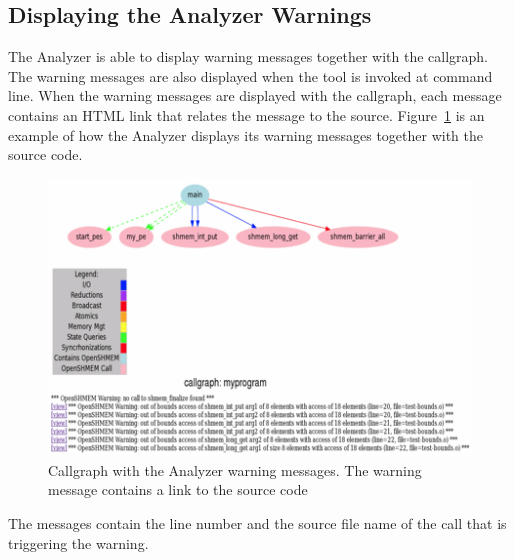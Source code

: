 \subsection{Displaying the \openshmem Analyzer Warnings}

The \openshmem Analyzer is able to display \openshmem warning messages
together with the callgraph. The warning messages are also displayed
when the tool is invoked at command line. When the warning messages
are displayed with the callgraph, each message contains an HTML link
that relates the message to the source. Figure~\ref{fig:warnings} is
an example of how the \openshmem Analyzer displays its warning messages
together with the source code.

\vspace{0.1in}

\begin{figure}[!h]
  \begin{center}
    \includegraphics[width=1.0\textwidth]{./image010}
    \caption{Callgraph with the \openshmem Analyzer warning messages.
      The warning message contains a link to the source code}
    \label{fig:warnings}
  \end{center}
\end{figure}

The messages contain the line number and the source file name of the
\openshmem call that is triggering the warning.

